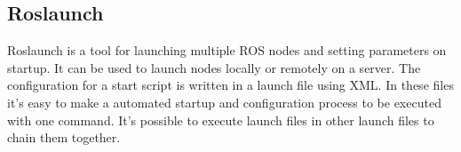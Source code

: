 \subsection{Roslaunch}
Roslaunch is a tool for launching multiple ROS nodes and setting parameters on startup. It can be used to launch nodes locally or remotely on a server.
The configuration for a start script is written in a launch file using XML. In these files it's easy to make a automated startup and configuration process to be executed with one command. It's possible to execute launch files in other launch files to chain them together.